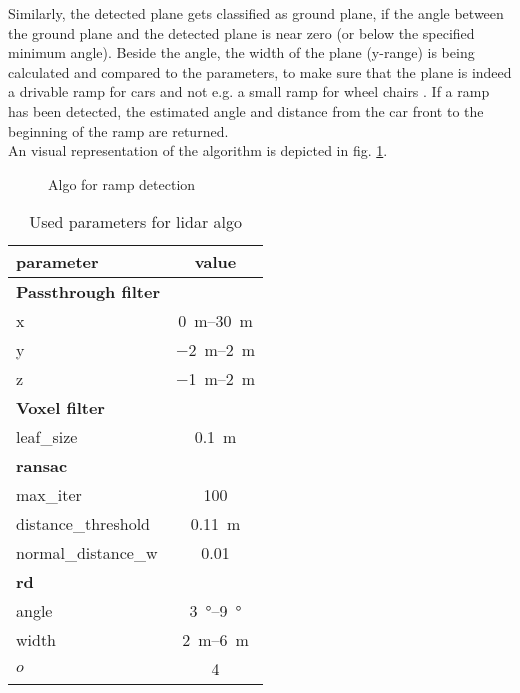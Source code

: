 Similarly, the detected plane gets classified as ground plane, if the angle between the ground plane and the detected plane is near zero (or below the specified minimum angle).
Beside the angle, the width of the plane (y-range) is being calculated and compared to the parameters, to make sure that the plane is indeed a drivable ramp for cars and not e.g. a small ramp for wheel chairs .
If a ramp has been detected, the estimated angle and distance from the car front to the beginning of the ramp are returned.\\
An visual representation of the algorithm is depicted in fig. \ref{fig:flowchart_lidar}.
\begin{figure}[htb]
    \centering
    
    \caption{Algo for ramp detection}
    \label{fig:flowchart_lidar}
\end{figure}

\begin{table}[htb]
	\centering
	\caption{Used parameters for lidar algo}
	\label{tab:lidar_params}
	\begin{tabular}[t]{lc}
	\toprule
	\textbf{parameter}  &\textbf{value} \\
	\midrule
    \textbf{Passthrough filter}\\
	x 				    & \SIrange{0}{30}{\metre}\\
    y 				    & \SIrange{-2}{2}{\metre}\\
	z                   & \SIrange{-1}{2}{\metre}\\
	\midrule
    \textbf{Voxel filter}\\
    leaf\_size          & \SI{0.1}{\metre}\\
    \midrule
    \textbf{\gls{ransac}}\\
    max\_iter           & 100\\
    distance\_threshold & \SI{0.11}{\metre}\\
    normal\_distance\_w & 0.01\\
    \midrule
    \textbf{rd}\\
    angle               & \SIrange{3}{9}{\degree}\\
    width               & \SIrange{2}{6}{\metre}\\
    $o$                 & 4\\
	\bottomrule
	\end{tabular}
\end{table}%



